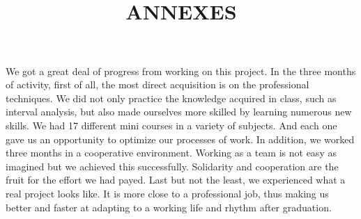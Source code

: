 \documentclass[a4paper]{report}
\begin{document}
We got a great deal of progress from working on this project. In the three months of activity, first of all, the most direct acquisition is on the professional techniques. We did not only practice the knowledge acquired in class, such as interval analysis, but also made ourselves more skilled by learning numerous new skills. We had 17 different mini courses in a variety of subjects. And each one gave us an opportunity to optimize our processes of work. In addition, we worked three months in a cooperative environment. Working as a team is not easy as imagined but we achieved this successfully. Solidarity and cooperation are the fruit for the effort we had payed.  Last but not the least, we experienced what a real project looks like. It is more close to a professional job, thus making us better and faster at adapting to a working life and rhythm after graduation.

\newpage
\nocite{*}


%
%


\newpage

	\begin{center}
		\title{ \HRule{} \\ [12cm]
				\LARGE \textbf{\uppercase{Annexes}}\\ [12cm]
				\HRule{}}
		\maketitle
	\end{center}
\end{document}
